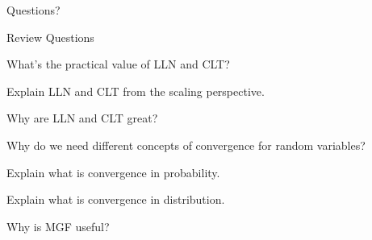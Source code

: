 \begin{frame}{}
\vspace{2cm}
\LARGE Questions?

\end{frame}


\begin{frame}{Review Questions}

\bce[1)]
\item What's the practical value of LLN and CLT?

\item Explain LLN and CLT from the scaling perspective.

\item Why are LLN and CLT great?

\item Why do we need different concepts of convergence for random variables?

\item Explain what is convergence in probability.

\item Explain what is convergence in distribution.

\item Why is MGF useful?

\ece

\end{frame}


